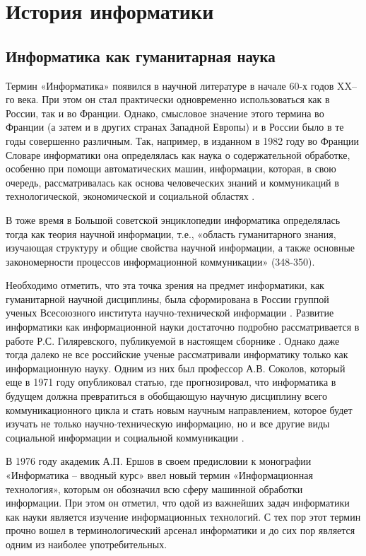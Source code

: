 \newpage

\section{История информатики} \label{sect1_2}

\subsection{Информатика как гуманитарная наука} \label{subsect1_2_1}

Термин «Информатика» появился в научной литературе в начале 60-х годов XX–го века. При этом он стал практически одновременно использоваться как в России, так и во Франции. Однако, смысловое значение этого термина во Франции (а затем и в других странах Западной Европы) и в России было в те годы совершенно различным. Так, например, в изданном в 1982 году во Франции Словаре информатики она определялась как наука о содержательной обработке, особенно при помощи автоматических машин, информации, которая, в свою очередь, рассматривалась как основа человеческих знаний и коммуникаций в технологической, экономической и социальной областях \cite{bib202}.

В тоже время в Большой советской энциклопедии информатика определялась тогда как теория научной информации, т.е., «область гуманитарного знания, изучающая структуру и общие свойства научной информации, а также основные закономерности процессов информационной коммуникации» \cite{bib203}(348-350). 

Необходимо отметить, что эта точка зрения на предмет информатики, как гуманитарной научной дисциплины, была сформирована в России группой ученых Всесоюзного института научно-технической информации \cite{bib204,bib205}. Развитие информатики как информационной науки достаточно подробно рассматривается в работе Р.С. Гиляревского, публикуемой в настоящем сборнике \cite{bib206}.  Однако даже тогда далеко не все российские ученые рассматривали информатику только как информационную науку. Одним из них был профессор А.В. Соколов, который еще в 1971 году опубликовал статью, где прогнозировал, что информатика в будущем должна превратиться в обобщающую научную дисциплину всего коммуникационного цикла  и стать новым научным направлением, которое будет изучать не только научно-техническую информацию, но и все другие виды социальной информации и социальной коммуникации \cite{bib207}.

       В 1976 году академик А.П. Ершов в своем предисловии к монографии «Информатика – вводный курс» ввел новый термин «Информационная технология», которым он обозначил всю сферу машинной обработки информации. При этом он отметил, что одой из важнейших задач информатики как науки является изучение информационных технологий. С тех пор этот термин прочно вошел в терминологический арсенал информатики и до сих пор является одним из наиболее употребительных.

